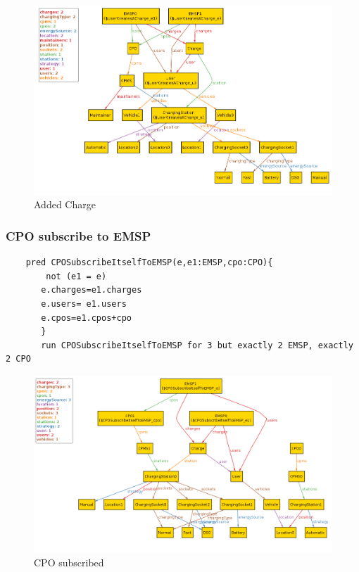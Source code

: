 \begin{figure}[H]
    \includegraphics[keepaspectratio, width=16cm]{Alloy/UserCreatesCharge.png}
    \caption{Added Charge}
\end{figure}

\subsubsection{CPO subscribe to EMSP}
\begin{verbatim}
    pred CPOSubscribeItselfToEMSP(e,e1:EMSP,cpo:CPO){
        not (e1 = e)
       e.charges=e1.charges
       e.users= e1.users
       e.cpos=e1.cpos+cpo
       }
       run CPOSubscribeItselfToEMSP for 3 but exactly 2 EMSP, exactly 2 CPO           
\end{verbatim}
\begin{figure}[H]
    \includegraphics[keepaspectratio, width=16cm]{Alloy/CpoSubscribetoEMSP.png}
    \caption{CPO subscribed}
\end{figure}

